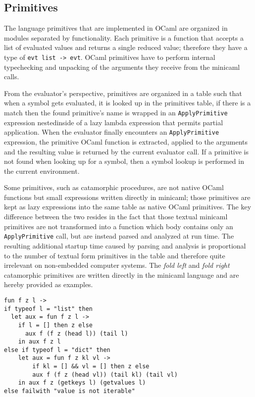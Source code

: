 \documentclass[a4paper, 10pt]{article}
\theoremstyle{plain}%
\theoremstyle{definition}
\theoremstyle{remark}
\begin{document}
\begin{multicols}{2}
\section{Primitives}
The language primitives that are implemented in OCaml are organized in modules
separated by functionality. Each primitive is a function that accepts a list of
evaluated values and returns a single reduced value; therefore they have a type
of \texttt{evt list -> evt}. OCaml primitives have to perform internal
typechecking and unpacking of the arguments they receive from the minicaml
calls.

From the evaluator's perspective, primitives are organized in a table
such that when a symbol gets evaluated, it is looked up in the primitives table,
if there is a match then the found primitive's name is wrapped in an
\texttt{ApplyPrimitive} expression nestedinside of a lazy lambda expression that
permits partial application. When the evaluator finally encounters an
\texttt{ApplyPrimitive} expression, the primitive OCaml function is extracted,
applied to the arguments and the resulting value is returned by the current
evaluator call. If a primitive is not found when looking up for a symbol, then a
symbol lookup is performed in the current environment.

Some primitives, such as catamorphic procedures, are not native OCaml functions
but small expressions written directly in minicaml; those primitives are kept as
lazy expressions into the same table as native OCaml primitives. The key
difference between the two resides in the fact that those textual minicaml
primitives are not transformed into a function which body contains only an
\texttt{ApplyPrimitive} call, but are instead parsed and analyzed at run time.
The resulting additional startup time caused by parsing and analysis is
proportional to the number of textual form primitives in the table and therefore
quite irrelevant on non-embedded computer systems. The \textit{fold left} and
\textit{fold right} catamorphic primitives are written directly in the minicaml
language and are hereby provided as examples.

\begin{lstlisting}[style=caml,caption=The tail recursive left fold procedure]
fun f z l ->
if typeof l = "list" then
  let aux = fun f z l ->
    if l = [] then z else
	  aux f (f z (head l)) (tail l)
	in aux f z l
else if typeof l = "dict" then
	let aux = fun f z kl vl ->
		if kl = [] && vl = [] then z else
		aux f (f z (head vl)) (tail kl) (tail vl)
	in aux f z (getkeys l) (getvalues l)
else failwith "value is not iterable"
\end{lstlisting}


\end{multicols}
\end{document}
